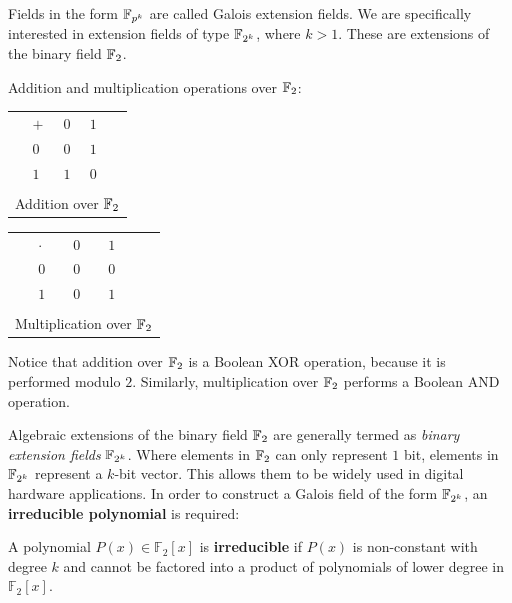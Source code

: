 Fields in the form ${\mathbb{F}}_{p^{k}}$ are called Galois extension fields.
We are specifically interested in extension fields of type 
${\mathbb{F}}_{2^k}$, where $k > 1$. These are extensions of the binary
field ${\mathbb{F}}_2$.
\begin{Example}
Addition and multiplication operations over ${\mathbb{F}}_2$:
\begin{table}[!h]
	\centering
	\begin{tabular}{m{1cm}|l|ll|m{1cm}}
	\hhline{~---~}
	\multirow{3}{*}{} & $+$ & $0$ & $1$ & \multirow{3}{*}{} \\
	\hhline{~---~}
	& $0$ & $0$ & $1$ & \\
	& $1$ & $1$ & $0$ & \\
	\hhline{~---~}
	\multicolumn{5}{c}{}\\
	\multicolumn{5}{c}{Addition over ${\mathbb{F}}_2$}\\
	\end{tabular}
	\quad
	\begin{tabular}{m{1cm}|l|ll|m{1cm}}
	\hhline{~---~}
	\multirow{3}{*}{} & $\cdot$ & $0$ & $1$ & \multirow{3}{*}{} \\
	\hhline{~---~}
	& $0$ & $0$ & $0$ & \\
	& $1$ & $0$ & $1$ & \\
	\hhline{~---~}
	\multicolumn{5}{c}{}\\
	\multicolumn{5}{c}{Multiplication over ${\mathbb{F}}_2$}\\
	\end{tabular}
\end{table}

Notice that addition over ${\mathbb{F}}_2$ is a Boolean {\sc XOR} operation, 
because it is performed modulo $2$.
Similarly, multiplication over ${\mathbb{F}}_2$ performs a Boolean {\sc AND} operation.
\end{Example}

Algebraic extensions of the binary field ${\mathbb{F}}_{2}$  
are generally termed as {\it binary extension fields} ${\mathbb{F}}_{2^k}$.
Where elements in ${\mathbb{F}}_2$ can only represent $1$ bit, elements in ${\mathbb{F}}_{2^k}$ 
represent a $k$-bit vector.
This allows them to be widely used in digital hardware applications.
In order to construct a Galois field of the form ${\mathbb{F}}_{2^k}$, 
an {\bf irreducible polynomial} is required:
\begin{Definition}
A polynomial $P(x) \in \mathbb{F}_{2}\left[x\right]$ is {\bf irreducible} 
if $P(x)$ is non-constant with degree $k$ and cannot be 
factored into a product of polynomials of lower degree in $\mathbb{F}_2[x]$.
\end{Definition}

